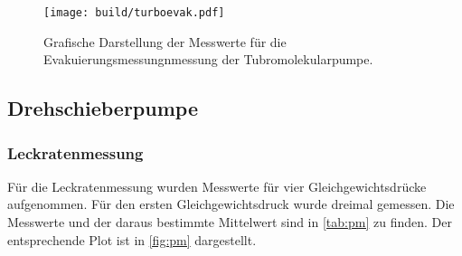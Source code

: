 \begin{figure}[H]
  \centering
  \texttt{[image: build/turboevak.pdf]}
  \caption{Grafische Darstellung der Messwerte für die Evakuierungsmessungnmessung der Tubromolekularpumpe.}
  \label{fig:turboevak}
\end{figure}

\subsection{Drehschieberpumpe}
\subsubsection{Leckratenmessung}
Für die Leckratenmessung wurden Messwerte für vier Gleichgewichtsdrücke aufgenommen. Für den ersten
Gleichgewichtsdruck wurde dreimal gemessen. Die Messwerte und der daraus bestimmte Mittelwert sind in
\autoref{tab:pm} zu finden. Der entsprechende Plot ist in \autoref{fig:pm} dargestellt.

